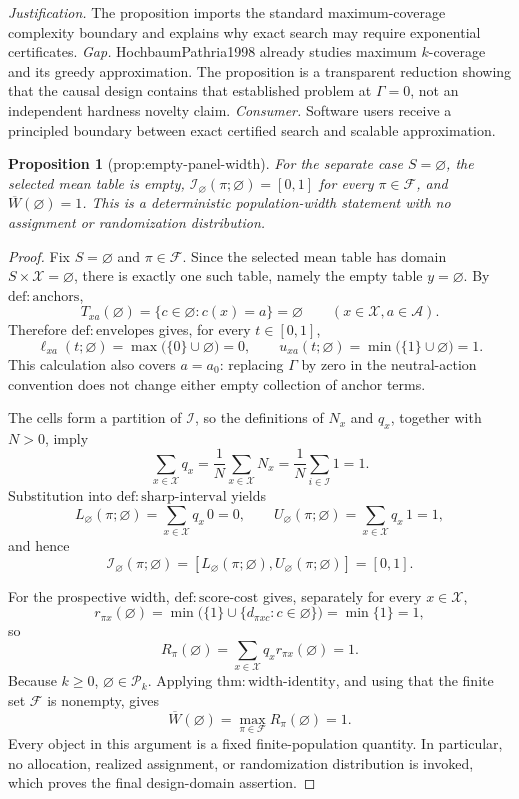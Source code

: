 \documentclass{article}
\newtheorem{proposition}{Proposition}
\begin{document}
\par\smallskip\noindent \textit{Justification.} The proposition imports the standard maximum-coverage complexity boundary and explains why exact search may require exponential certificates. \textit{Gap.} HochbaumPathria1998 already studies maximum \(k\)-coverage and its greedy approximation. The proposition is a transparent reduction showing that the causal design contains that established problem at \(\Gamma=0\), not an independent hardness novelty claim. \textit{Consumer.} Software users receive a principled boundary between exact certified search and scalable approximation.

\begin{proposition}[prop:empty-panel-width]\label{prop:empty-panel-width}
For the separate case \(S=\varnothing\), the selected mean table is empty, \(\mathcal I_{\varnothing}(\pi;\varnothing)=[0,1]\) for every \(\pi\in\mathcal F\), and \(\overline W(\varnothing)=1\). This is a deterministic population-width statement with no assignment or randomization distribution.
\end{proposition}
\begin{proof}
Fix \(S=\varnothing\) and \(\pi\in\mathcal F\).  Since the selected mean table has domain \(S\times\mathcal X=\varnothing\), there is exactly one such table, namely the empty table \(y=\varnothing\).  By \(\mathrm{def{:}anchors}\),
\[
T_{xa}(\varnothing)=\{c\in\varnothing:c(x)=a\}=\varnothing
\qquad (x\in\mathcal X, a\in\mathcal A).
\]
Therefore \(\mathrm{def{:}envelopes}\) gives, for every \(t\in[0,1]\),
\[
\ell_{xa}(t;\varnothing)
=\max\bigl(\{0\}\cup\varnothing\bigr)=0,
\qquad
u_{xa}(t;\varnothing)
=\min\bigl(\{1\}\cup\varnothing\bigr)=1.
\]
This calculation also covers \(a=a_0\): replacing \(\Gamma\) by zero in the neutral-action convention does not change either empty collection of anchor terms.

The cells form a partition of \(\mathcal I\), so the definitions of \(N_x\) and \(q_x\), together with \(N>0\), imply
\[
\sum_{x\in\mathcal X}q_x
=\frac{1}{N}\sum_{x\in\mathcal X}N_x
=\frac{1}{N}\sum_{i\in\mathcal I}1
=1.
\]
Substitution into \(\mathrm{def{:}sharp\text{-}interval}\) yields
\[
L_{\varnothing}(\pi;\varnothing)
=\sum_{x\in\mathcal X}q_x\,0=0,
\qquad
U_{\varnothing}(\pi;\varnothing)
=\sum_{x\in\mathcal X}q_x\,1=1,
\]
and hence
\[
\mathcal I_{\varnothing}(\pi;\varnothing)
=[L_{\varnothing}(\pi;\varnothing),U_{\varnothing}(\pi;\varnothing)]
=[0,1].
\]

For the prospective width, \(\mathrm{def{:}score\text{-}cost}\) gives, separately for every \(x\in\mathcal X\),
\[
r_{\pi x}(\varnothing)
=\min\bigl(\{1\}\cup\{d_{\pi xc}:c\in\varnothing\}\bigr)
=\min\{1\}=1,
\]
so
\[
R_{\pi}(\varnothing)
=\sum_{x\in\mathcal X}q_xr_{\pi x}(\varnothing)
=1.
\]
Because \(k\geq0\), \(\varnothing\in\mathcal P_k\).  Applying \(\mathrm{thm{:}width\text{-}identity}\), and using that the finite set \(\mathcal F\) is nonempty, gives
\[
\overline W(\varnothing)
=\max_{\pi\in\mathcal F}R_{\pi}(\varnothing)
=1.
\]
Every object in this argument is a fixed finite-population quantity.  In particular, no allocation, realized assignment, or randomization distribution is invoked, which proves the final design-domain assertion.
\end{proof}
\end{document}
